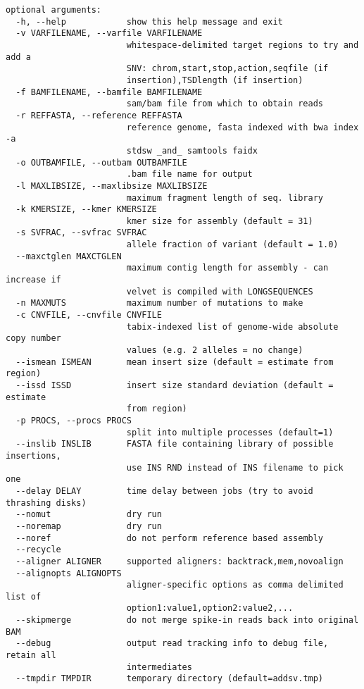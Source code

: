 \documentclass[letterpaper,11pt]{article}
\begin{document}
\begin{verbatim}
optional arguments:
  -h, --help            show this help message and exit
  -v VARFILENAME, --varfile VARFILENAME
                        whitespace-delimited target regions to try and add a
                        SNV: chrom,start,stop,action,seqfile (if
                        insertion),TSDlength (if insertion)
  -f BAMFILENAME, --bamfile BAMFILENAME
                        sam/bam file from which to obtain reads
  -r REFFASTA, --reference REFFASTA
                        reference genome, fasta indexed with bwa index -a
                        stdsw _and_ samtools faidx
  -o OUTBAMFILE, --outbam OUTBAMFILE
                        .bam file name for output
  -l MAXLIBSIZE, --maxlibsize MAXLIBSIZE
                        maximum fragment length of seq. library
  -k KMERSIZE, --kmer KMERSIZE
                        kmer size for assembly (default = 31)
  -s SVFRAC, --svfrac SVFRAC
                        allele fraction of variant (default = 1.0)
  --maxctglen MAXCTGLEN
                        maximum contig length for assembly - can increase if
                        velvet is compiled with LONGSEQUENCES
  -n MAXMUTS            maximum number of mutations to make
  -c CNVFILE, --cnvfile CNVFILE
                        tabix-indexed list of genome-wide absolute copy number
                        values (e.g. 2 alleles = no change)
  --ismean ISMEAN       mean insert size (default = estimate from region)
  --issd ISSD           insert size standard deviation (default = estimate
                        from region)
  -p PROCS, --procs PROCS
                        split into multiple processes (default=1)
  --inslib INSLIB       FASTA file containing library of possible insertions,
                        use INS RND instead of INS filename to pick one
  --delay DELAY         time delay between jobs (try to avoid thrashing disks)
  --nomut               dry run
  --noremap             dry run
  --noref               do not perform reference based assembly
  --recycle
  --aligner ALIGNER     supported aligners: backtrack,mem,novoalign
  --alignopts ALIGNOPTS
                        aligner-specific options as comma delimited list of
                        option1:value1,option2:value2,...
  --skipmerge           do not merge spike-in reads back into original BAM
  --debug               output read tracking info to debug file, retain all
                        intermediates
  --tmpdir TMPDIR       temporary directory (default=addsv.tmp)



\end{verbatim}
\end{document}
